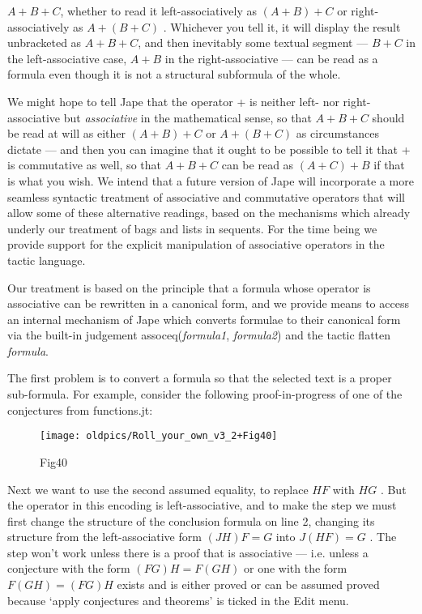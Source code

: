 $A+B+C$, whether to read it left-associatively as $(A+B)+C$ or right-associatively as $A+(B+C)$ . Whichever you tell it, it will display the result unbracketed as $A+B+C$, and then inevitably some textual segment --- $B+C$ in the left-associative case, $A+B$ in the right-associative --- can be read as a formula even though it is not a structural subformula of the whole.


We might hope to tell Jape that the operator + is neither left- nor right-associative but \textit{associative} in the mathematical sense, so that $A+B+C$ should be read at will as either $(A+B)+C$ or $A+(B+C)$ as circumstances dictate --- and then you can imagine that it ought to be possible to tell it that + is commutative as well, so that $A+B+C$ can be read as $(A+C)+B$ if that is what you wish. We intend that a future version of Jape will incorporate a more seamless syntactic treatment of associative and commutative operators that will allow some of these alternative readings, based on the mechanisms which already underly our treatment of bags and lists in sequents. For the time being we provide support for the explicit manipulation of associative operators in the tactic language.


Our treatment is based on the principle that a formula whose operator is associative can be rewritten in a canonical form, and we provide means to access an internal mechanism of Jape which converts formulae to their canonical form via the built-in judgement assoceq(\textit{formula1}, \textit{formula2}) and the tactic flatten \textit{formula}.


The first problem is to convert a formula so that the selected text is a proper sub-formula. For example, consider the following proof-in-progress of one of the conjectures from functions.jt:

\begin{figure}[htbp] \begin{center} \texttt{[image: oldpics/Roll\_your\_own\_v3\_2+Fig40]} \caption{Fig40} \end{center} \end{figure}


Next we want to use the second assumed equality, to replace $HF$ with $HG$ . But the {\textbullet} operator in this encoding is left-associative, and to make the step we must first change the structure of the conclusion formula on line 2, changing its structure from the left-associative form $(JH)F=G$ into $J(HF)=G$ . The step won't work unless there is a proof that {\textbullet} is associative --- i.e. unless a conjecture with the form $(FG)H=F(GH)$ or one with the form $F(GH)=(FG)H$ exists and is either proved or can be assumed proved because `apply conjectures and theorems' is ticked in the Edit menu.


